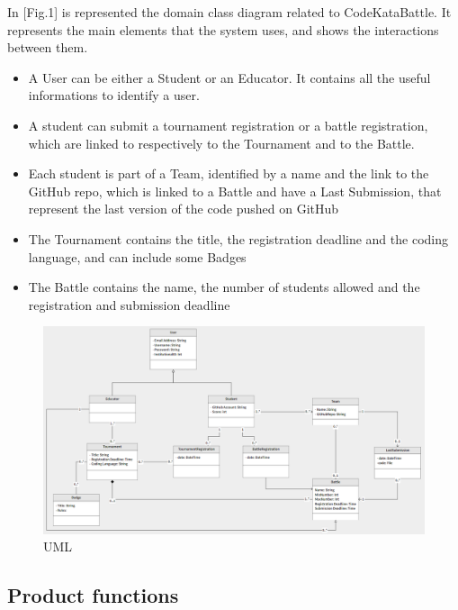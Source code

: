\documentclass[12pt,oneside,a4paper]{article}
\begin{document}
In [Fig.1] is represented the domain class diagram related to CodeKataBattle. It represents the main elements that the system uses, and shows the interactions between them.
\begin{itemize}
    \item A User can be either a Student or an Educator. It contains all the useful informations to identify a user.
    \item A student can submit a tournament registration or a battle registration, which are linked to respectively to the Tournament and to the Battle. 
    \item Each student is part of a Team, identified by a name and the link to the GitHub repo, which is linked to a Battle and have a Last Submission, that represent the last version of the code pushed on GitHub
    \item The Tournament contains the title, the registration deadline and the coding language, and can include some Badges
    \item The Battle contains the name, the number of students allowed and the registration and submission deadline
\end{itemize}

\begin{figure}[H]
    \centering
    \includegraphics[width=1\linewidth]{Images/Diagrams/UML.png}
    \caption{UML}
    \label{fig:enter-label}
\end{figure}

\subsection{Product functions}
\end{document}
